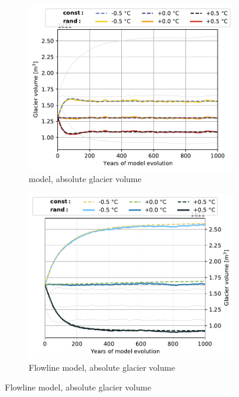 \begin{figure}[htp]
\begin{subfigure}[b]{0.48\textwidth}
      \end{subfigure}
      \begin{subfigure}[b]{0.48\textwidth}
        \caption{\Vas{} model, absolute glacier volume}
        \label{fig:histalp_commitment:volume_abs_const}
        \centering
        \includegraphics[width=\textwidth]{../plots/final_plots/time_series/histalp_commitment/volume_abs_vas.pdf}
      \end{subfigure}
      \hfill
      \begin{subfigure}[b]{0.48\textwidth}
        \caption{Flowline model, absolute glacier volume}
        \label{fig:histalp_commitment:volume_abs_random}
        \centering
        \includegraphics[width=\textwidth]{../plots/final_plots/time_series/histalp_commitment/volume_abs_fl.pdf}
      \end{subfigure}
      

\end{figure}
